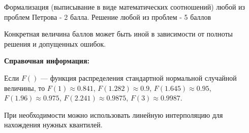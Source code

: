 \documentclass[addpoints, answers]{exam} %
\begin{document}
\begin{questions}
\begin{parts}
\begin{solution}
Формализация (выписывание в виде математических соотношений) любой из проблем Петрова - 2 балла. Решение любой из проблем - 5 баллов

Конкретная величина баллов может быть иной в зависимости от полноты решения и допущенных ошибок.
\end{solution}

\end{parts}



\end{questions}
\textbf{Справочная информация:} 

\vspace{6pt}

Если $F()$ --- функция распределения стандартной нормальной случайной величины, то $F(1)\approx 0.841$, $F(1.282)\approx 0.9$, $F(1.645)\approx 0.95$, $F(1.96)\approx 0.975$, $F(2.241)\approx 0.9875$, $F(3)\approx 0.9987$.

При необходимости можно использовать линейную интерполяцию для нахождения нужных квантилей.
\end{document}
